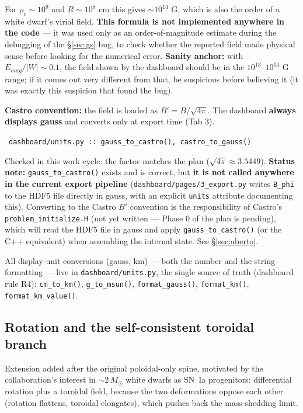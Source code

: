 \documentclass[11pt,a4paper]{scrartcl}
\newcommand{\arrowto}[1]{%
  \par\vspace{2pt}\noindent{\color{linkblue}$\rightarrow$}~\texttt{\small #1}\par\vspace{2pt}}
\newcommand{\code}[1]{\texttt{\small #1}}
\begin{document}
For $\rho_c\sim10^9$ and $R\sim10^8$ cm this gives $\sim10^{14}$ G, which
is also the order of a white dwarf's virial field. \textbf{This formula
is not implemented anywhere in the code} --- it was used only as an
order-of-magnitude estimate during the debugging of the \S\ref{sec:gs}
bug, to check whether the reported field made physical sense before
looking for the numerical error. \textbf{Sanity anchor:} with
$E_{mag}/|W|\sim0.1$, the field shown by the dashboard should be in the
$10^{13}$--$10^{14}$ G range; if it comes out very different from that,
be suspicious before believing it (it was exactly this suspicion that
found the bug).

\textbf{Castro convention:} the field is loaded as $B'=B/\sqrt{4\pi}$.
The dashboard \textbf{always displays gauss} and converts only at export
time (Tab 3).

\arrowto{dashboard/units.py :: gauss\_to\_castro(), castro\_to\_gauss()} Checked in this work cycle: the factor matches the plan ($\sqrt{4\pi}\approx3.5449$). \textbf{Status note:} \code{gauss\_to\_castro()} exists and is correct, but \textbf{it is not called anywhere in the current export pipeline} (\code{dashboard/pages/3\_export.py} writes \code{B\_phi} to the HDF5 file directly in gauss, with an explicit \code{units} attribute documenting this). Converting to the Castro $B'$ convention is the responsibility of Castro's \code{problem\_initialize.H} (not yet written --- Phase 0 of the plan is pending), which will read the HDF5 file in gauss and apply \code{gauss\_to\_castro()} (or the C++ equivalent) when assembling the internal state. See \S\ref{sec:aberto}.

All display-unit conversions (gauss, km) --- both the number and the
string formatting --- live in \code{dashboard/units.py}, the single
source of truth (dashboard rule R4): \code{cm\_to\_km()},
\code{g\_to\_msun()}, \code{format\_gauss()}, \code{format\_km()},
\code{format\_km\_value()}.

\subsection{Rotation and the self-consistent toroidal branch}
\label{sec:rotation}

Extension added after the original poloidal-only spine, motivated by the
collaboration's interest in $\sim2\,M_\odot$ white dwarfs as SN~Ia
progenitors: differential rotation plus a toroidal field, because the two
deformations oppose each other (rotation flattens, toroidal elongates),
which pushes back the mass-shedding limit.
\end{document}
